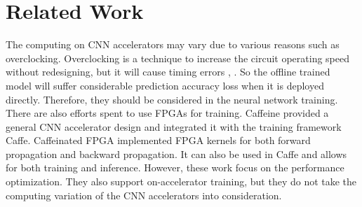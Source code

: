 \section{Related Work} \label{sec:relatedwork}
The computing on CNN accelerators may vary due to various reasons 
such as overclocking.
Overclocking is a technique to increase the circuit operating speed 
without redesigning, but it will cause timing errors \cite{overclock_3}, \cite{Razor}.  
So the offline trained model will suffer considerable prediction 
accuracy loss when it is deployed directly. Therefore, they should be considered in the 
neural network training.
There are also efforts spent to use FPGAs for training. 
Caffeine\cite{Caffeine_6} provided a general CNN accelerator design and integrated it with
the training framework Caffe. Caffeinated FPGA\cite{DiCecco_4} implemented FPGA kernels
for both forward propagation and backward propagation. It can also be used in Caffe and allows for
both training and inference. However, these work focus on the performance optimization.
They also support on-accelerator training, but they do not take the computing
variation of the CNN accelerators into consideration. 

